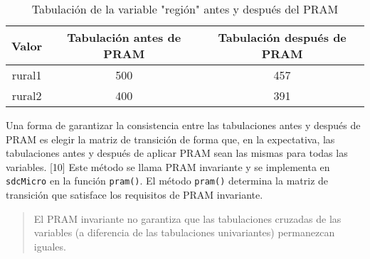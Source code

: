 \documentclass[
]{book}
\newenvironment{Shaded}{\begin{snugshade}}{\end{snugshade}}
\newcommand{\AttributeTok}[1]{\textcolor[rgb]{0.77,0.63,0.00}{#1}}
\newcommand{\CommentTok}[1]{\textcolor[rgb]{0.56,0.35,0.01}{\textit{#1}}}
\newcommand{\FunctionTok}[1]{\textcolor[rgb]{0.00,0.00,0.00}{#1}}
\newcommand{\NormalTok}[1]{#1}
\newcommand{\OtherTok}[1]{\textcolor[rgb]{0.56,0.35,0.01}{#1}}
\newcommand{\SpecialCharTok}[1]{\textcolor[rgb]{0.00,0.00,0.00}{#1}}
\newcommand{\StringTok}[1]{\textcolor[rgb]{0.31,0.60,0.02}{#1}}
\theoremstyle{definition}
\theoremstyle{definition}
\theoremstyle{definition}
\theoremstyle{definition}
\theoremstyle{remark}
\begin{document}
\begin{table}

\caption{\label{tab:Tabla13}\label{tab:Tabla13}Tabulación de la variable "región" antes y después del PRAM}
\centering
\begin{tabular}[t]{ccc}
\toprule
Valor & Tabulación antes de PRAM & Tabulación después de PRAM\\
\midrule
rural1 & 500 & 457\\
rural2 & 400 & 391\\
\bottomrule
\end{tabular}
\end{table}

Una forma de garantizar la consistencia entre las tabulaciones antes y después de PRAM es elegir la matriz de transición de forma que, en la expectativa, las tabulaciones antes y después de aplicar PRAM sean las mismas para todas las variables. {[}10{]} Este método se llama PRAM invariante y se implementa en \texttt{sdcMicro} en la función \texttt{pram()}. El método \texttt{pram()} determina la matriz de transición que satisface los requisitos de PRAM invariante.

\begin{quote}
El PRAM invariante no garantiza que las tabulaciones cruzadas de las variables (a diferencia de las tabulaciones univariantes) permanezcan iguales.
\end{quote}

\begin{Shaded}
\end{Shaded}
\end{document}
